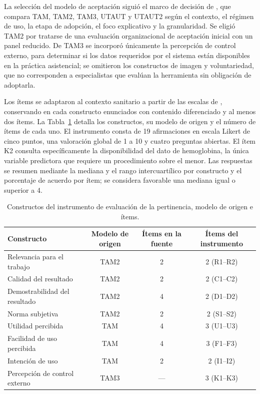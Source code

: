 \documentclass[final,5p,times,twocolumn,authoryear,lefttitle]{elsarticle}
\begin{document}
La selección del modelo de aceptación siguió el marco de decisión de \citet{britto2026framework}, que compara TAM, TAM2, TAM3, UTAUT y UTAUT2 según el contexto, el régimen de uso, la etapa de adopción, el foco explicativo y la granularidad. Se eligió TAM2 por tratarse de una evaluación organizacional de aceptación inicial con un panel reducido. De TAM3 \citep{venkatesh2008tam3} se incorporó únicamente la percepción de control externo, para determinar si los datos requeridos por el sistema están disponibles en la práctica asistencial; se omitieron los constructos de imagen y voluntariedad, que no corresponden a especialistas que evalúan la herramienta sin obligación de adoptarla.

Los ítems se adaptaron al contexto sanitario a partir de las escalas de \citet{venkatesh2000tam2}, conservando en cada constructo enunciados con contenido diferenciado y al menos dos ítems. La Tabla~\ref{tab:constructos_tam} detalla los constructos, su modelo de origen y el número de ítems de cada uno. El instrumento consta de 19 afirmaciones en escala Likert de cinco puntos, una valoración global de 1 a 10 y cuatro preguntas abiertas. El ítem K2 consulta específicamente la disponibilidad del dato de hemoglobina, la única variable predictora que requiere un procedimiento sobre el menor. Las respuestas se resumen mediante la mediana y el rango intercuartílico por constructo y el porcentaje de acuerdo por ítem; se considera favorable una mediana igual o superior a 4.

\begin{table}[t]
\centering
\caption{Constructos del instrumento de evaluación de la pertinencia, modelo de origen e ítems.}
\label{tab:constructos_tam}
\begin{tabular}{lccc}
\hline
Constructo & Modelo de origen & Ítems en la fuente & Ítems del instrumento \\
\hline
Relevancia para el trabajo & TAM2 & 2 & 2 (R1--R2) \\
Calidad del resultado & TAM2 & 2 & 2 (C1--C2) \\
Demostrabilidad del resultado & TAM2 & 4 & 2 (D1--D2) \\
Norma subjetiva & TAM2 & 2 & 2 (S1--S2) \\
Utilidad percibida & TAM & 4 & 3 (U1--U3) \\
Facilidad de uso percibida & TAM & 4 & 3 (F1--F3) \\
Intención de uso & TAM & 2 & 2 (I1--I2) \\
Percepción de control externo & TAM3 & --- & 3 (K1--K3) \\
\hline
\end{tabular}
\end{table}
\end{document}
